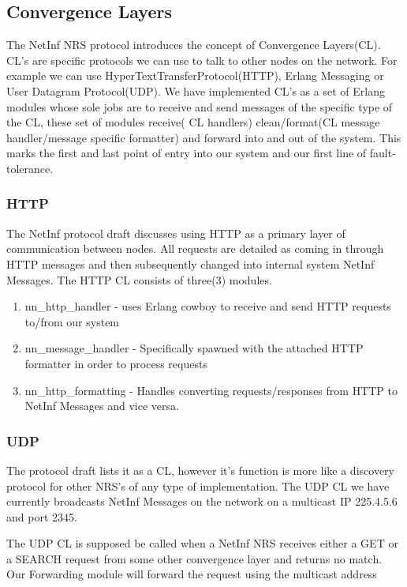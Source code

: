\subsection {Convergence Layers}

The NetInf NRS protocol introduces the concept of Convergence Layers(CL). CL's are specific protocols we can use to talk to other nodes on the network. For example we can use HyperTextTransferProtocol(HTTP), Erlang Messaging or User Datagram Protocol(UDP). We have implemented CL's as a set of Erlang modules whose sole jobs are to receive and send messages of the specific type of the CL, these set of modules  receive( CL handlers) clean/format(CL message handler/message specific formatter) and forward into and out of the system. This marks the first and last point of entry into our system and our first line of fault-tolerance. 

\subsubsection{HTTP}

The NetInf protocol draft discusses using HTTP as a primary layer of communication between nodes. All requests are detailed as coming in through HTTP messages and then subsequently changed into internal system NetInf Messages. The HTTP CL consists of three(3) modules. 

\begin{enumerate}
\item nn\_http\_handler - uses Erlang cowboy to receive and send HTTP requests to/from our system
\item nn\_message\_handler - Specifically spawned with the attached HTTP formatter in order to process requests
\item nn\_http\_formatting - Handles converting requests/responses from HTTP  to NetInf Messages and vice versa.
\end{enumerate}


\subsubsection{UDP}

The protocol draft lists it as a CL, however it's function is more like a discovery protocol for other NRS's of any type of implementation. The UDP CL we have currently broadcasts NetInf Messages on the network on a multicast IP 225.4.5.6 and port 2345. 

The UDP CL is supposed be called when a NetInf NRS receives either a GET or a SEARCH request from some other convergence layer and returns no match. Our Forwarding module will forward the request using the multicast address

